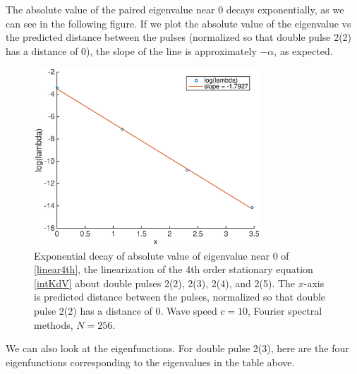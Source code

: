 \documentclass[12pt]{article}
\begin{document}
The absolute value of the paired eigenvalue near 0 decays exponentially, as we can see in the following figure. If we plot the absolute value of the eigenvalue vs the predicted distance between the pulses (normalized so that double pulse 2(2) has a distance of 0), the slope of the line is approximately $-\alpha$, as expected.
\begin{figure}[H]
	\includegraphics[width=8.5cm]{decayinteigenvalue}
	\caption{Exponential decay of absolute value of eigenvalue near 0 of \eqref{linear4th}, the linearization of the 4th order stationary equation \eqref{intKdV} about double pulses 2(2), 2(3), 2(4), and 2(5). The $x$-axis is predicted distance between the pulses, normalized so that double pulse 2(2) has a distance of 0. Wave speed $c = 10$, Fourier spectral methods, $N = 256$.}
\end{figure}

We can also look at the eigenfunctions. For double pulse 2(3), here are the four eigenfunctions corresponding to the eigenvalues in the table above.
\end{document}

